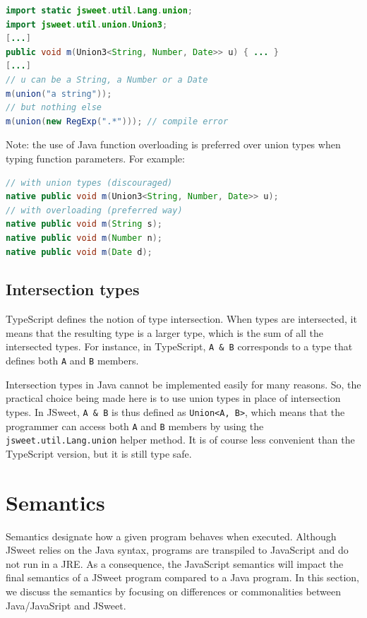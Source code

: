 \documentclass[a4paper]{report}
\begin{document}
\begin{lstlisting}[language=Java]
import static jsweet.util.Lang.union;
import jsweet.util.union.Union3;
[...]
public void m(Union3<String, Number, Date>> u) { ... }
[...]
// u can be a String, a Number or a Date
m(union("a string"));
// but nothing else
m(union(new RegExp(".*"))); // compile error
\end{lstlisting}

Note: the use of Java function overloading is preferred over union types when typing function parameters. For example:

\begin{lstlisting}[language=Java]
// with union types (discouraged)
native public void m(Union3<String, Number, Date>> u);
// with overloading (preferred way)
native public void m(String s);
native public void m(Number n);
native public void m(Date d);
\end{lstlisting}

\section{Intersection types}

TypeScript defines the notion of type intersection. When types are intersected, it means that the resulting type is a larger type, which is the sum of all the intersected types. For instance, in TypeScript, \texttt{A \& B} corresponds to a type that defines both \texttt{A} and \texttt{B} members.

Intersection types in Java cannot be implemented easily for many reasons. So, the practical choice being made here is to use union types in place of intersection types. In JSweet, \texttt{A \& B} is thus defined as \texttt{Union<A, B>}, which means that the programmer can access both \texttt{A} and \texttt{B} members by using the \texttt{jsweet\-.util\-.Lang\-.union} helper method. It is of course less convenient than the TypeScript version, but it is still type safe.

\chapter{Semantics}
\label{semantics}

Semantics designate how a given program behaves when executed. Although JSweet relies on the Java syntax, programs are transpiled to JavaScript and do not run in a JRE. As a consequence, the JavaScript semantics will impact the final semantics of a JSweet program compared to a Java program. In this section, we discuss the semantics by focusing on differences or commonalities between Java/JavaSript and JSweet.
\end{document}

